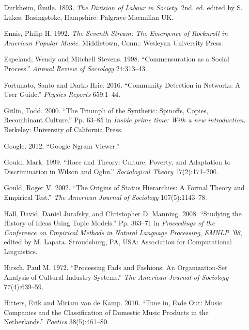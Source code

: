\documentclass[]{book}
\theoremstyle{definition}
\theoremstyle{definition}
\theoremstyle{definition}
\theoremstyle{remark}
\begin{document}
\leavevmode\hypertarget{ref-Durkheim1893division}{}%
Durkheim, Émile. 1893. \emph{The Division of Labour in Society}. 2nd.
ed. edited by S. Lukes. Basingstoke, Hampshire: Palgrave Macmillan UK.

\leavevmode\hypertarget{ref-Ennis1992seventh}{}%
Ennis, Philip H. 1992. \emph{The Seventh Stream: The Emergence of
Rocknroll in American Popular Music}. Middletown, Conn.: Wesleyan
University Press.

\leavevmode\hypertarget{ref-Espeland1998Commensuration}{}%
Espeland, Wendy and Mitchell Stevens. 1998. ``Commensuration as a Social
Process.'' \emph{Annual Review of Sociology} 24:313--43.

\leavevmode\hypertarget{ref-Fortunato2016Community}{}%
Fortunato, Santo and Darko Hric. 2016. ``Community Detection in
Networks: A User Guide.'' \emph{Physics Reports} 659:1--44.

\leavevmode\hypertarget{ref-Gitlin2000Triumph}{}%
Gitlin, Todd. 2000. ``The Triumph of the Synthetic: Spinoffs, Copies,
Recombinant Culture.'' Pp. 63--85 in \emph{Inside prime time: With a new
introduction}. Berkeley: University of California Press.

\leavevmode\hypertarget{ref-2012Google}{}%
Google. 2012. ``Google Ngram Viewer.''

\leavevmode\hypertarget{ref-Gould1999Race}{}%
Gould, Mark. 1999. ``Race and Theory: Culture, Poverty, and Adaptation
to Discrimination in Wilson and Ogbu.'' \emph{Sociological Theory}
17(2):171--200.

\leavevmode\hypertarget{ref-Gould2002Origins}{}%
Gould, Roger V. 2002. ``The Origins of Status Hierarchies: A Formal
Theory and Empirical Test.'' \emph{The American Journal of Sociology}
107(5):1143--78.

\leavevmode\hypertarget{ref-Hall2008Studying}{}%
Hall, David, Daniel Jurafsky, and Christopher D. Manning. 2008.
``Studying the History of Ideas Using Topic Models.'' Pp. 363--71 in
\emph{Proceedings of the Conference on Empirical Methods in Natural
Language Processing}, \emph{EMNLP '08}, edited by M. Lapata.
Stroudsburg, PA, USA: Association for Computational Linguistics.

\leavevmode\hypertarget{ref-Hirsch1972Processing}{}%
Hirsch, Paul M. 1972. ``Processing Fads and Fashions: An
Organization-Set Analysis of Cultural Industry Systems.'' \emph{The
American Journal of Sociology} 77(4):639--59.

\leavevmode\hypertarget{ref-Hitters2010Tune}{}%
Hitters, Erik and Miriam van de Kamp. 2010. ``Tune in, Fade Out: Music
Companies and the Classification of Domestic Music Products in the
Netherlands.'' \emph{Poetics} 38(5):461--80.
\end{document}
